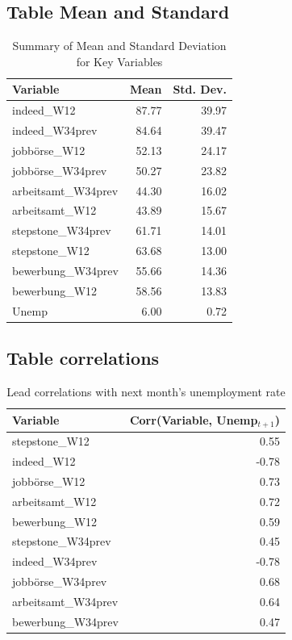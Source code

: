\documentclass[12pt,a4paper]{article}
\begin{document}
\subsection{Table Mean and Standard}
\begin{table}[H]
    \centering
    \caption{Summary of Mean and Standard Deviation for Key Variables}
    \label{tab:descshort}
    \begin{tabular}{lrr}
        \toprule
        Variable & Mean & Std. Dev. \\
        \midrule
        indeed\_W12 & 87.77 & 39.97 \\
        indeed\_W34prev & 84.64 & 39.47 \\
        jobbörse\_W12 & 52.13 & 24.17 \\
        jobbörse\_W34prev & 50.27 & 23.82 \\
        arbeitsamt\_W34prev & 44.30 & 16.02 \\
        arbeitsamt\_W12 & 43.89 & 15.67 \\
        stepstone\_W34prev & 61.71 & 14.01 \\
        stepstone\_W12 & 63.68 & 13.00 \\
        bewerbung\_W34prev & 55.66 & 14.36 \\
        bewerbung\_W12 & 58.56 & 13.83 \\
        Unemp & 6.00 & 0.72 \\
        \bottomrule
    \end{tabular}
\end{table}

\subsection{Table correlations}
\begin{table}[H]
    \centering
    \caption{Lead correlations with next month’s unemployment rate}
    \label{tab:corrlead}
    \begin{tabular}{lr}
        \toprule
        Variable & Corr(Variable, Unemp$_{t+1}$) \\
        \midrule
        stepstone\_W12 & 0.55 \\
        indeed\_W12 & -0.78 \\
        jobbörse\_W12 & 0.73 \\
        arbeitsamt\_W12 & 0.72 \\
        bewerbung\_W12 & 0.59 \\
        stepstone\_W34prev & 0.45 \\
        indeed\_W34prev & -0.78 \\
        jobbörse\_W34prev & 0.68 \\
        arbeitsamt\_W34prev & 0.64 \\
        bewerbung\_W34prev & 0.47 \\
        \bottomrule
    \end{tabular}
\end{table}
\end{document}
